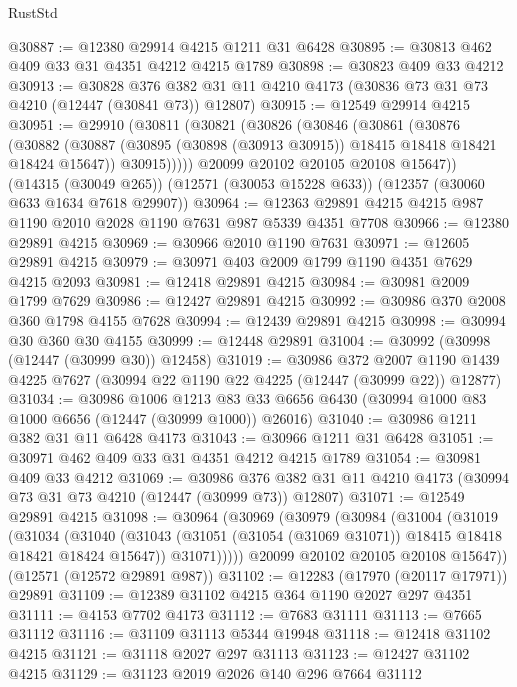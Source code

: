 \begin{lexlean}{RustStd}
\begin{coremodule}
@30887 := @12380 @29914 @4215 @1211 @31 @6428
@30895 := @30813 @462 @409 @33 @31 @4351 @4212 @4215 @1789
@30898 := @30823 @409 @33 @4212
@30913 := @30828
    @376
    @382
    @31
    @11
    @4210
    @4173
    (@30836 @73 @31 @73 @4210 (@12447 (@30841 @73)) @12807)
@30915 := @12549 @29914 @4215
@30951 := @29910
    (@30811
      (@30821
        (@30826
          (@30846
            (@30861
              (@30876
                (@30882
                  (@30887 (@30895 (@30898 (@30913 @30915)) @18415 @18418 @18421 @18424 @15647))
                  @30915)))))
        @20099
        @20102
        @20105
        @20108
        @15647))
    (@14315 (@30049 @265))
    (@12571 (@30053 @15228 @633))
    (@12357 (@30060 @633 @1634 @7618 @29907))
@30964 := @12363 @29891 @4215 @4215 @987 @1190 @2010 @2028 @1190 @7631 @987 @5339 @4351 @7708
@30966 := @12380 @29891 @4215
@30969 := @30966 @2010 @1190 @7631
@30971 := @12605 @29891 @4215
@30979 := @30971 @403 @2009 @1799 @1190 @4351 @7629 @4215 @2093
@30981 := @12418 @29891 @4215
@30984 := @30981 @2009 @1799 @7629
@30986 := @12427 @29891 @4215
@30992 := @30986 @370 @2008 @360 @1798 @4155 @7628
@30994 := @12439 @29891 @4215
@30998 := @30994 @30 @360 @30 @4155
@30999 := @12448 @29891
@31004 := @30992 (@30998 (@12447 (@30999 @30)) @12458)
@31019 := @30986
    @372
    @2007
    @1190
    @1439
    @4225
    @7627
    (@30994 @22 @1190 @22 @4225 (@12447 (@30999 @22)) @12877)
@31034 := @30986
    @1006
    @1213
    @83
    @33
    @6656
    @6430
    (@30994 @1000 @83 @1000 @6656 (@12447 (@30999 @1000)) @26016)
@31040 := @30986 @1211 @382 @31 @11 @6428 @4173
@31043 := @30966 @1211 @31 @6428
@31051 := @30971 @462 @409 @33 @31 @4351 @4212 @4215 @1789
@31054 := @30981 @409 @33 @4212
@31069 := @30986
    @376
    @382
    @31
    @11
    @4210
    @4173
    (@30994 @73 @31 @73 @4210 (@12447 (@30999 @73)) @12807)
@31071 := @12549 @29891 @4215
@31098 := @30964
    (@30969
      (@30979
        (@30984
          (@31004
            (@31019
              (@31034
                (@31040
                  (@31043 (@31051 (@31054 (@31069 @31071)) @18415 @18418 @18421 @18424 @15647))
                  @31071)))))
        @20099
        @20102
        @20105
        @20108
        @15647))
    (@12571 (@12572 @29891 @987))
@31102 := @12283 (@17970 (@20117 @17971)) @29891
@31109 := @12389 @31102 @4215 @364 @1190 @2027 @297 @4351
@31111 := @4153 @7702 @4173
@31112 := @7683 @31111
@31113 := @7665 @31112
@31116 := @31109 @31113 @5344 @19948
@31118 := @12418 @31102 @4215
@31121 := @31118 @2027 @297 @31113
@31123 := @12427 @31102 @4215
@31129 := @31123 @2019 @2026 @140 @296 @7664 @31112

\end{coremodule}
\end{lexlean}
